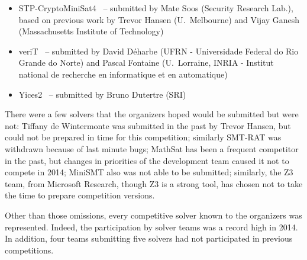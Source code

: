 \documentclass[twoside,11pt]{article}
\begin{document}
\begin{itemize}
\item STP-CryptoMiniSat4~\cite{DBLP:conf/cav/GaneshD07,DBLP:conf/cav/2007} -- submitted by Mate Soos (Security Research Lab.), based on previous work by Trevor Hansen (U.~Melbourne) and Vijay Ganesh (Massachusetts Institute of Technology)\\[-15pt]
\item veriT~\cite{veriT} -- submitted by David D\'{e}harbe (UFRN - Universidade Federal do Rio Grande do Norte) and Pascal Fontaine (U.~Lorraine, INRIA - Institut national de recherche en informatique et en automatique)\\[-15pt]
\item Yices2~\cite{Dutertre:cav2014} -- submitted by Bruno Dutertre (SRI)
\end{itemize}

There were a few solvers that the organizers hoped would be submitted but were not: Tiffany de Wintermonte was submitted in the past by Trevor Hansen, but could not be prepared in time for this competition; similarly SMT-RAT was withdrawn because of last minute bugs; MathSat has been a frequent competitor in the past, but changes in priorities of the development team caused it not to compete in 2014; MiniSMT also was not able to be submitted; similarly, the Z3 team, from Microsoft Research, though Z3 is a strong tool, has chosen not to take the time to prepare competition versions.

Other than those omissions, every competitive solver known to the organizers was represented. Indeed, the participation by solver teams was a record high in 2014. In addition, four teams submitting five solvers had not participated in previous competitions.

\begin{table}[b!]
\caption{Changes in participation}
\label{Table:changes}
\centering
{}
\end{table}
\end{document}
